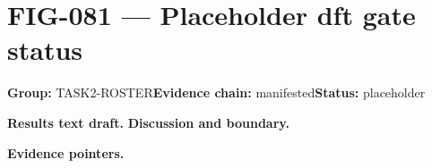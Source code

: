 \clearpage
\section{FIG-081 --- Placeholder dft gate status}
\label{figpage:fig-081}
\textbf{Group:} TASK2-ROSTER\quad \textbf{Evidence chain:} manifested\quad \textbf{Status:} placeholder

\textbf{Results text draft.} 
\textbf{Discussion and boundary.} 


\textbf{Evidence pointers.}



\vfill
